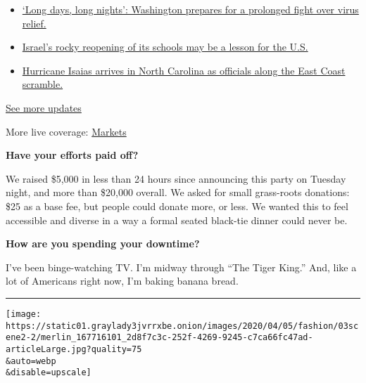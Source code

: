 \begin{itemize}
\tightlist
\item
  \href{https://www.nytimes3xbfgragh.onion/2020/08/04/world/coronavirus-covid-19.html?action=click\&pgtype=Article\&state=default\&region=MAIN_CONTENT_1\&context=storylines_live_updates\#link-6b644638}{`Long
  days, long nights': Washington prepares for a prolonged fight over
  virus relief.}
\item
  \href{https://www.nytimes3xbfgragh.onion/2020/08/04/world/coronavirus-covid-19.html?action=click\&pgtype=Article\&state=default\&region=MAIN_CONTENT_1\&context=storylines_live_updates\#link-7af9fca0}{Israel's
  rocky reopening of its schools may be a lesson for the U.S.}
\item
  \href{https://www.nytimes3xbfgragh.onion/2020/08/04/world/coronavirus-covid-19.html?action=click\&pgtype=Article\&state=default\&region=MAIN_CONTENT_1\&context=storylines_live_updates\#link-33bf9168}{Hurricane
  Isaias arrives in North Carolina as officials along the East Coast
  scramble.}
\end{itemize}

\href{https://www.nytimes3xbfgragh.onion/2020/08/04/world/coronavirus-covid-19.html?action=click\&pgtype=Article\&state=default\&region=MAIN_CONTENT_1\&context=storylines_live_updates}{See
more updates}

More live coverage:
\href{https://www.nytimes3xbfgragh.onion/live/2020/08/03/business/stock-market-today-coronavirus?action=click\&pgtype=Article\&state=default\&region=MAIN_CONTENT_1\&context=storylines_live_updates}{Markets}

\textbf{Have your efforts paid off?}

We raised \$5,000 in less than 24 hours since announcing this party on
Tuesday night, and more than \$20,000 overall. We asked for small
grass-roots donations: \$25 as a base fee, but people could donate more,
or less. We wanted this to feel accessible and diverse in a way a formal
seated black-tie dinner could never be.

\textbf{How are you spending your downtime?}

I've been binge-watching TV. I'm midway through ``The Tiger King.'' And,
like a lot of Americans right now, I'm baking banana bread.

\begin{center}\rule{0.5\linewidth}{\linethickness}\end{center}

\texttt{[image: https://static01.graylady3jvrrxbe.onion/images/2020/04/05/fashion/03scene2-2/merlin\_167716101\_2d8f7c3c-252f-4269-9245-c7ca66fc47ad-articleLarge.jpg?quality=75\\\&auto=webp\\\&disable=upscale]}


